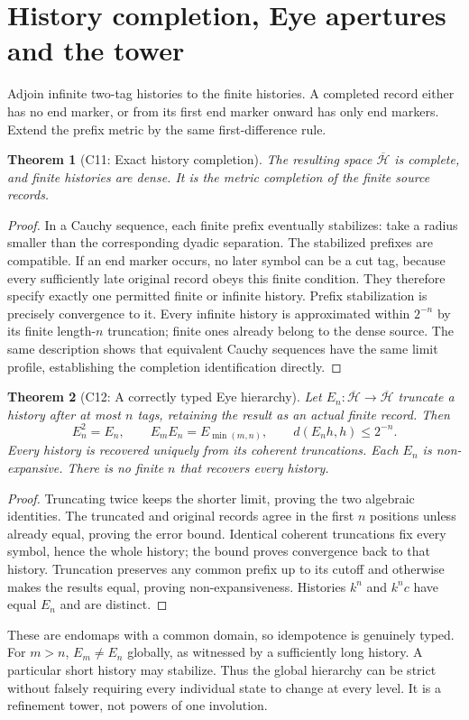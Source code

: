 \documentclass[11pt]{article}
\newtheorem{theorem}{Theorem}[section]
\newcommand{\Hist}{\mathcal H}
\begin{document}
\section{History completion, Eye apertures and the tower}
\label{sec:history-completion}
Adjoin infinite two-tag histories to the finite histories. A completed record
either has no end marker, or from its first end marker onward has only end
markers. Extend the prefix metric by the same first-difference rule.

\begin{theorem}[C11: Exact history completion]
\label{thm:history-completion}
The resulting space $\overline{\Hist}$ is complete, and finite histories are
dense. It is the metric completion of the finite source records.
\end{theorem}
\begin{proof}
In a Cauchy sequence, each finite prefix eventually stabilizes: take a radius
smaller than the corresponding dyadic separation. The stabilized prefixes
are compatible. If an end marker occurs, no later symbol can be a cut tag,
because every sufficiently late original record obeys this finite condition.
They therefore specify exactly one permitted finite or infinite history.
Prefix stabilization is precisely convergence to it. Every infinite history
is approximated within $2^{-n}$ by its finite length-$n$ truncation; finite
ones already belong to the dense source. The same description shows that
equivalent Cauchy sequences have the same limit profile, establishing the
completion identification directly.
\end{proof}

\begin{theorem}[C12: A correctly typed Eye hierarchy]
\label{thm:eye}
Let $E_n:\overline{\Hist}\to\overline{\Hist}$ truncate a history after at
most $n$ tags, retaining the result as an actual finite record. Then
\[
E_n^2=E_n,\qquad E_mE_n=E_{\min(m,n)},\qquad
d(E_nh,h)\le2^{-n}.
\]
Every history is recovered uniquely from its coherent truncations. Each
$E_n$ is non-expansive. There is no finite $n$ that recovers every history.
\end{theorem}
\begin{proof}
Truncating twice keeps the shorter limit, proving the two algebraic identities.
The truncated and original records agree in the first $n$ positions unless
already equal, proving the error bound. Identical coherent truncations fix
every symbol, hence the whole history; the bound proves convergence back to
that history. Truncation preserves any common prefix up to its cutoff and
otherwise makes the results equal, proving non-expansiveness. Histories
$k^n$ and $k^nc$ have equal $E_n$ and are distinct.
\end{proof}
These are endomaps with a common domain, so idempotence is genuinely typed.
For $m>n$, $E_m\ne E_n$ globally, as witnessed by a sufficiently long history.
A particular short history may stabilize. Thus the global hierarchy can be
strict without falsely requiring every individual state to change at every
level. It is a refinement tower, not powers of one involution.
\end{document}
